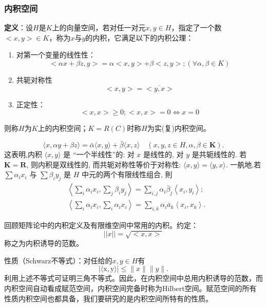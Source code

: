 \documentclass[12pt,a4paper]{article}
\begin{document}
\subsubsection{内积空间}
\textbf{定义}：设$H$是$K$上的向量空间，若对任一对元$x,y\in H$，指定了一个数$<x,y>\in K$，称为$x$与$y$的内积，它满足以下的内积公理：
\begin{enumerate}
	\item 对第一个变量的线性性：
	\begin{equation}
		<\alpha x+\beta z, y>=\alpha<x, y>+\beta<z, y>;(\forall \alpha, \beta \in K)
	\end{equation}
	\item 共轭对称性
	\begin{equation}
<x, y>=\overline{<y, x>}
\end{equation}
	\item 正定性：
	\begin{equation}
<x, x>\geqslant 0 ;<x, x>=0 \Leftrightarrow x=0
\end{equation}
\end{enumerate}
则称$H$为$K$上的内积空间；$K=R(C)$时称$H$为实(复)内积空间。

$$
\langle x, \alpha y+\beta z\rangle=\bar{\alpha}\langle x, y\rangle+\bar{\beta}\langle x, z\rangle \quad(x, y, z \in H, \alpha, \beta \in \mathbf{K}) .
$$
这表明,内积 $\langle x, y\rangle$ 是 “一个半线性”的: 对 $x$ 是线性的, 对 $y$ 是共轭线性的. 若 $\mathbf{K}=\mathbf{R}$, 则内积是双线性的, 而共轭对称性等价于对称性: $\langle x, y\rangle=\langle y, x\rangle$. 一舧地,若 $\sum \alpha_{i} x_{i}$ 与 $\sum \beta_{i} y_{j}$ 是 $H$ 中元的两个有限线性组合, 則
$$
\begin{aligned}
&\left\langle\sum_{i} \alpha_{i} x_{i}, \sum_{j} \beta_{i} y_{j}\right\rangle=\sum_{i, j} \alpha_{i} \bar{\beta}_{j}\left\langle x_{i}, y_{i}\right\rangle ; \\
&\left\langle\sum_{i} \alpha_{i} x_{i}, \sum_{i} \alpha_{i} x_{i}\right\rangle=\sum_{i, k} \alpha_{i} \bar{a}_{k}\left\langle x_{i}, x_{k}\right\rangle .
\end{aligned}
$$

回顾矩阵论中的内积定义及有限维空间中常用的内积。约定：
\begin{equation}
|| x||=\sqrt{<x, x>}
\end{equation}
称之为内积诱导的范数。

性质（Schwarz不等式）：对任给的$x,y\in H$有
\begin{equation}
|\langle\mathrm{x}, \mathrm{y}\rangle|\leq\|x\|\|y\| .
\end{equation}
利用上述不等式可证明三角不等式。因此，在内积空间中总用内积诱导的范数，而内积空间自动看成赋范空间，内积空间完备时称为Hilbert空间。赋范空间的所有性质内积空间也都具备，我们要研究的是内积空间所特有的性质。
\end{document}
